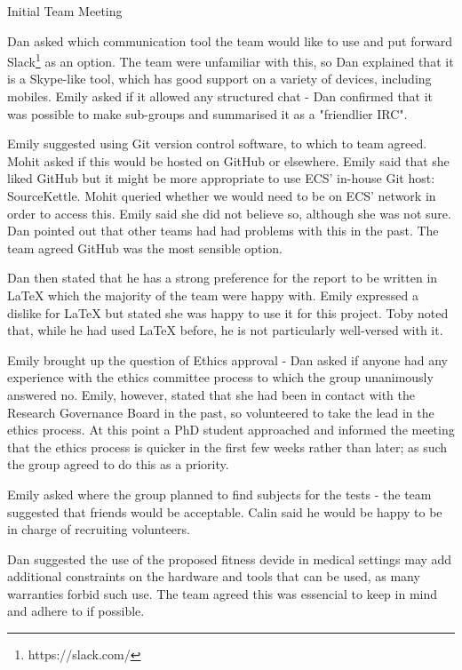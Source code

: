 \documentclass{article}
\begin{document}
\begin{Minutes}{Initial Team Meeting}

Dan asked which communication tool the team would like to use and put
forward Slack\footnote{https://slack.com/} as an option. The team were unfamiliar with this, so Dan
explained that it is a Skype-like tool, which has good support on a
variety of devices, including mobiles. Emily asked if it allowed any
structured chat - Dan confirmed that it was possible to make sub-groups
and summarised it as a "friendlier IRC".

Emily suggested using Git version control software, to which to team
agreed. Mohit asked if this would be hosted on GitHub or elsewhere. Emily
said that she liked GitHub but it might be more appropriate to use ECS'
in-house Git host: SourceKettle. Mohit queried whether we would need to be
on ECS' network in order to access this. Emily said she did not believe so,
although she was not sure. Dan pointed out that other teams had had
problems with this in the past. The team agreed GitHub was the most
sensible option.

Dan then stated that he has a strong preference for the report to be
written in LaTeX which the majority of the team were happy with. Emily expressed a dislike
for LaTeX but stated she was happy to use it for this project. Toby noted
that, while he had used LaTeX before, he is not particularly well-versed
with it.


Emily brought up the question of Ethics approval - Dan asked if anyone
had any experience with the ethics committee process to which the group
unanimously answered no. Emily, however, stated that she had been in
contact with the Research Governance Board in the past, so volunteered to
take the lead in the ethics process. At this point a PhD student
approached and informed the meeting that the ethics process is quicker in
the first few weeks rather than later; as such the group agreed to do this as a priority.

Emily asked where the group planned to find subjects for the tests
- the team suggested that friends would be acceptable. Calin said he
would be happy to be in charge of recruiting volunteers.

Dan suggested the use of the proposed fitness devide in medical settings may add additional constraints on the hardware
and tools that can be used, as many warranties forbid such use. The team agreed this was essencial to keep in mind and adhere
to if possible.


\end{Minutes}
\end{document}
